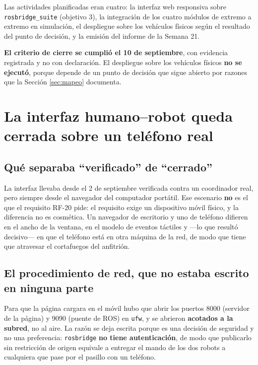 \documentclass[12pt,letterpaper]{article}
\begin{document}
Las actividades planificadas eran cuatro: la interfaz web responsiva sobre \texttt{rosbridge\_suite} (objetivo 3), la integración de los cuatro módulos de extremo a extremo en simulación, el despliegue sobre los vehículos físicos según el resultado del punto de decisión, y la emisión del informe de la Semana 21.

\textbf{El criterio de cierre se cumplió el 10 de septiembre}, con evidencia registrada y no con declaración. El despliegue sobre los vehículos físicos \textbf{no se ejecutó}, porque depende de un punto de decisión que sigue abierto por razones que la Sección \ref{sec:mapeo} documenta.

\section{La interfaz humano--robot queda cerrada sobre un teléfono real}
\label{sec:hri}

\subsection{Qué separaba ``verificado'' de ``cerrado''}

La interfaz llevaba desde el 2 de septiembre verificada contra un coordinador real, pero siempre desde el navegador del computador portátil. Ese escenario \textbf{no} es el que el requisito RF-20 pide: el requisito exige un dispositivo móvil físico, y la diferencia no es cosmética. Un navegador de escritorio y uno de teléfono difieren en el ancho de la ventana, en el modelo de eventos táctiles y ---lo que resultó decisivo--- en que el teléfono está en otra máquina de la red, de modo que tiene que atravesar el cortafuegos del anfitrión.

\subsection{El procedimiento de red, que no estaba escrito en ninguna parte}

Para que la página cargara en el móvil hubo que abrir los puertos 8000 (servidor de la página) y 9090 (puente de ROS) en \texttt{ufw}, y se abrieron \textbf{acotados a la subred}, no al aire. La razón se deja escrita porque es una decisión de seguridad y no una preferencia: \texttt{rosbridge} \textbf{no tiene autenticación}, de modo que publicarlo sin restricción de origen equivale a entregar el mando de los dos robots a cualquiera que pase por el pasillo con un teléfono.
\end{document}
